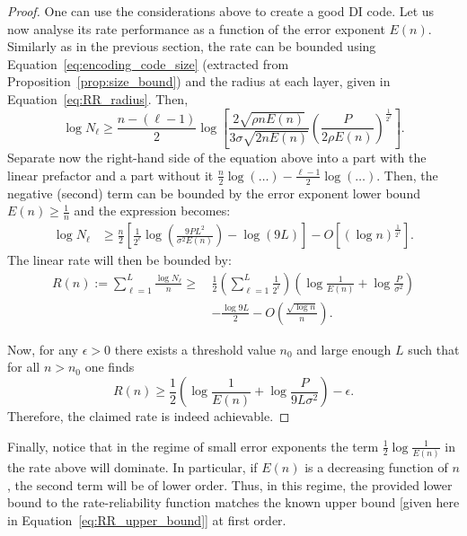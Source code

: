 \documentclass[10pt,conference]{IEEEtran}
\newcommand{\1}{\mathds{1}}
\begin{document}
\begin{proof}
One can use the considerations above to create a good DI code. Let us now analyse its rate performance as a function of the error exponent $E(n)$. Similarly as in the previous section, the rate can be bounded using Equation~\eqref{eq:encoding_code_size} (extracted from Proposition~\ref{prop:size_bound}) and the radius at each layer, given in Equation~\eqref{eq:RR_radius}. Then,
\begin{equation}
\log N_\ell\geq\frac{n-(\ell-1)}{2}\log\left[\frac{2\sqrt{\rho n E(n)}}{3\sigma\sqrt{2nE(n)}}\left(\frac{P}{2\rho E(n)}\right)^\frac{1}{2^\ell}\right].
\end{equation}
Separate now the right-hand side of the equation above into a part with the linear prefactor and a part without it $\frac{n}{2}\log(\dots)-\frac{\ell-1}{2}\log(\dots)$. Then, the negative (second) term can be bounded by the error exponent lower bound $E(n)\geq\frac1n$ and the expression becomes:
\begin{equation}
\begin{split}
\log N_\ell&\geq\!\frac{n}{2}\left[\frac{1}{2^\ell}\log\left(\frac{9PL^2}{\sigma^2 E(n)}\right)\!-\!\log\left(9L\right)\right]\!-\!O\left[(\log n)^\frac{1}{2^\ell}\right]\!.
\end{split}
\end{equation}
The linear rate will then be bounded by:
\begin{align}
R(n):=\sum_{\ell=1}^L\frac{\log N_\ell}{n}\geq\, &\frac12\left(\sum_{\ell=1}^L\frac{1}{2^\ell}\right)\!\!\left(\log\frac{1}{E(n)}+\log\frac{P}{\sigma^2}\right)\nonumber\\
&-\frac{\log 9L}{2}-O\left(\frac{\sqrt{\log n}}{n}\right).\label{eq:RR_rate}
\end{align}

Now, for any $\epsilon>0$ there exists a threshold value $n_0$ and large enough $L$ such that for all $n>n_0$ one finds 
\begin{equation}
R(n)\geq\frac12 \left(\log\frac{1}{E(n)}+\log\frac{P}{9L\sigma^2} \right)-\epsilon.
\end{equation}
Therefore, the claimed rate is indeed achievable.
\end{proof}

Finally, notice that in the regime of small error exponents the term $\frac{1}{2}\log\frac{1}{E(n)}$ in the rate above will dominate. In particular, if $E(n)$ is a decreasing function of $n$, the second term will be of lower order. Thus, in this regime, the provided lower bound to the rate-reliability function matches the known upper bound [given here in Equation~\eqref{eq:RR_upper_bound}] at first order. 
\end{document}
